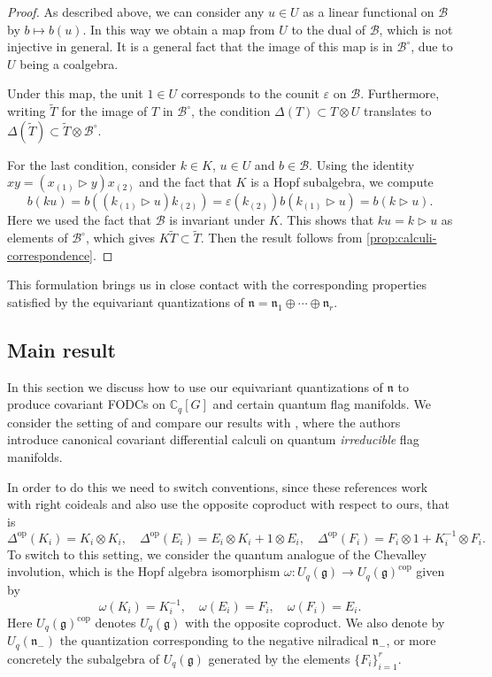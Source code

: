 \documentclass[a4paper, 12pt, reqno, english]{amsart}
\numberwithin{equation}{section}
\numberwithin{figure}{section}
\theoremstyle{plain}
\theoremstyle{plain}
\theoremstyle{plain}
\theoremstyle{plain}
\theoremstyle{plain}
\theoremstyle{definition}
\theoremstyle{definition}
\theoremstyle{definition}
\theoremstyle{remark}
\theoremstyle{definition}
\theoremstyle{definition}
\newcommand{\Uqg}{U_q(\mathfrak{g})}
\newcommand{\Uqnm}{U_q(\mathfrak{n}_-)}
\newcommand{\CqG}{\mathbb{C}_q[G]}
\newcommand{\op}{\mathrm{op}}
\newcommand{\lien}{\mathfrak{n}}
\newcommand{\calB}{\mathcal{B}}
\begin{document}
\begin{proof}
As described above, we can consider any $u \in U$ as a linear functional on $\calB$ by $b \mapsto b(u)$.
In this way we obtain a map from $U$ to the dual of $\calB$, which is not injective in general.
It is a general fact that the image of this map is in $\calB^\circ$, due to $U$ being a coalgebra.

Under this map, the unit $1 \in U$ corresponds to the counit $\varepsilon$ on $\calB$.
Furthermore, writing $\tilde{T}$ for the image of $T$ in $\calB^\circ$, the condition $\Delta(T) \subset T \otimes U$ translates to $\Delta(\tilde{T}) \subset \tilde{T} \otimes \calB^\circ$.

For the last condition, consider $k \in K$, $u \in U$ and $b \in \calB$.
Using the identity $x y = (x_{(1)} \triangleright y) x_{(2)}$ and the fact that $K$ is a Hopf subalgebra, we compute
\[
b(k u) = b((k_{(1)} \triangleright u) k_{(2)})
= \varepsilon(k_{(2)}) b(k_{(1)} \triangleright u)
= b(k \triangleright u).
\]
Here we used the fact that $\calB$ is invariant under $K$.
This shows that $k u = k \triangleright u$ as elements of $\calB^\circ$, which gives $K \tilde{T} \subset \tilde{T}$.
Then the result follows from \cref{prop:calculi-correspondence}.
\end{proof}

This formulation brings us in close contact with the corresponding properties satisfied by the equivariant quantizations of $\lien = \lien_1 \oplus \cdots \oplus \lien_r$.

\subsection{Main result}

In this section we discuss how to use our equivariant quantizations of $\lien$ to produce covariant FODCs on $\CqG$ and certain quantum flag manifolds.
We consider the setting of \cite{heko-homogeneous} and compare our results with \cite{heko}, where the authors introduce canonical covariant differential calculi on quantum \emph{irreducible} flag manifolds.

In order to do this we need to switch conventions, since these references work with right coideals and also use the opposite coproduct with respect to ours, that is
\[
\Delta^\op(K_i) = K_i \otimes K_i, \quad
\Delta^\op(E_i) = E_i \otimes K_i + 1 \otimes E_i, \quad
\Delta^\op(F_i) = F_i \otimes 1 + K_i^{-1} \otimes F_i.
\]
To switch to this setting, we consider the quantum analogue of the Chevalley involution, which is the Hopf algebra isomorphism $\omega: \Uqg \to \Uqg^{\mathrm{cop}}$ given by
\[
\omega(K_i) = K_i^{-1}, \quad
\omega(E_i) = F_i, \quad
\omega(F_i) = E_i.
\]
Here $\Uqg^{\mathrm{cop}}$ denotes $\Uqg$ with the opposite coproduct.
We also denote by $\Uqnm$ the quantization corresponding to the negative nilradical $\lien_-$, or more concretely the subalgebra of $\Uqg$ generated by the elements $\{ F_i \}_{i = 1}^r$.
\end{document}
